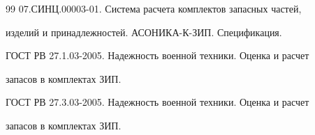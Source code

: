 {{\begin{thebibliography}{99}
     07.СИНЦ.00003-01. Система расчета комплектов запасных частей, 


изделий и принадлежностей. АСОНИКА-К-ЗИП. Спецификация.







     ГОСТ РВ 27.1.03-2005. Надежность военной техники. Оценка и расчет 


запасов в комплектах ЗИП.





 \label{end\stat}







     ГОСТ РВ 27.3.03-2005. Надежность военной техники. Оценка и расчет 


запасов в комплектах ЗИП.





 \end{thebibliography}


}


}


